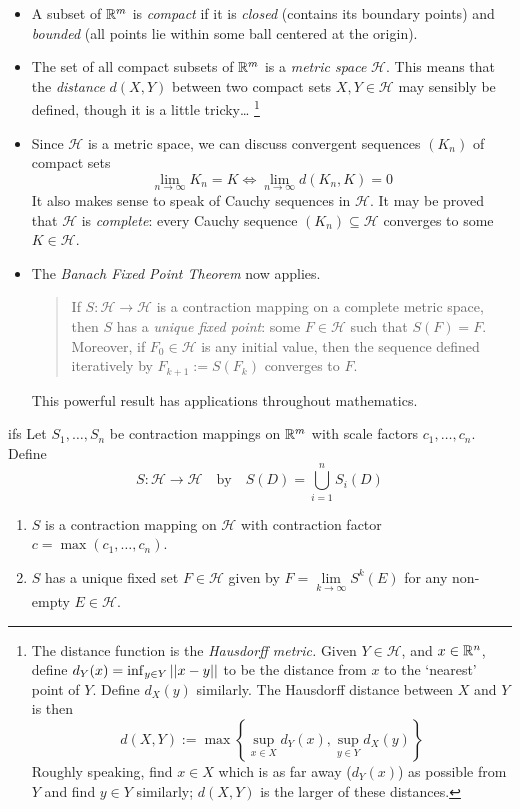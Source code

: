 \begin{itemize}
  \item A subset of $\mathbb{R}^m$ is \emph{compact} if it is \emph{closed} (contains its boundary points) and \emph{bounded} (all points lie within some ball centered at the origin).
  
  \item The set of all compact subsets of $\mathbb{R}^m$ is a \emph{metric space} $\mathcal H$. This means that the \emph{distance} $d(X,Y)$ between two compact sets $X,Y\in\mathcal H$ may sensibly be defined, though it is a little tricky\ldots%
  \footnote{%
  	The distance function is the \emph{Hausdorff metric.} Given $Y\in\mathcal H$, and $x\in \mathbb{R}^n$, define $d_Y(x)=\inf_{y\in Y}\left| \left| x-y\right|\right|$ to be the distance from $x$ to the `nearest' point of $Y$. Define $d_X(y)$ similarly. The Hausdorff distance between $X$ and $Y$ is then
  	\[
  		d(X,Y):=\max\left\{\sup_{x\in X}d_Y(x),\sup_{y\in Y}d_X(y)\right\}
  	\]
  	Roughly speaking, find $x\in X$ which is as far away ($d_Y(x)$) as possible from $Y$ and find $y\in Y$ similarly; $d(X,Y)$ is the larger of these distances.
  }
  
  \item Since $\mathcal H$ is a metric space, we can discuss convergent sequences $(K_n)$ of compact sets
	\[
		\lim_{n\to\infty}K_n=K\iff \lim_{n\to\infty}d(K_n,K)=0
	\]
	It also makes sense to speak of Cauchy sequences in $\mathcal H$. It may be proved that $\mathcal H$ is \emph{complete}: every Cauchy sequence $(K_n)\subseteq\mathcal H$ converges to some $K\in\mathcal H$.
	
  \item The \emph{Banach Fixed Point Theorem} now applies.
	\begin{quote}
	  If $S:\mathcal H\to\mathcal H$ is a contraction mapping on a complete metric space, then $S$ has a \emph{unique fixed point}: some $F\in\mathcal H$ such that $S(F)=F$. Moreover, if $F_0\in\mathcal H$ is any initial value, then the sequence defined iteratively by $F_{k+1}:=S(F_k)$ converges to $F$.
	\end{quote}
  This powerful result has applications throughout mathematics.
\end{itemize}


\begin{thm}{}{ifs}
	Let $S_1,\ldots,S_n$ be contraction mappings on $\mathbb{R}^m$ with scale factors $c_1,\ldots,c_n$. Define
	\[
		S:\mathcal H\to\mathcal H\quad\text{by}\quad S(D)=\bigcup_{i=1}^nS_i(D)
	\]
	\begin{enumerate}
	  \item $S$ is a contraction mapping on $\mathcal H$ with contraction factor $c=\max(c_1,\ldots,c_n)$.
	  \item $S$ has a unique fixed set $F\in\mathcal H$ given by $F=\lim\limits_{k\to\infty} S^k(E)$ for any non-empty $E\in\mathcal H$.
	\end{enumerate}
\end{thm}

